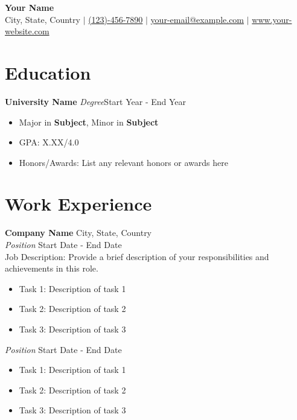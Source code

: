 \documentclass[a4paper,10pt]{article}
\newcommand{\colorLinkedinSign}{\textcolor{rgb:red,6;green,108;blue,170}{\faLinkedinSquare}}
\begin{document}
\begin{center}
\textbf{\color{myBlue}\huge Your Name} \quad \href{https://www.linkedin.com/in/your-linkedin-profile/}{\Large\colorLinkedinSign}\\
City, State, Country $\vert$ \href{tel:+1234567890}{(123)-456-7890} $\vert$ \href{mailto:your-email@example.com}{your-email@example.com} $\vert$ \href{http://www.your-website.com}{www.your-website.com}
\end{center}


\section{Education}
\textbf{University Name} \hfill \textit{Degree}\hfill Start Year - End Year
\begin{itemize}[leftmargin=*]
\setlength\itemsep{0em}
    \item Major in \textbf{Subject}, Minor in \textbf{Subject}
    \item GPA: X.XX/4.0
    \item Honors/Awards: List any relevant honors or awards here
\end{itemize}

\section{Work Experience}
\textbf{\color{myBlue}Company Name} \hfill City, State, Country\\ 
\textit{Position} \hfill Start Date - End Date\\
Job Description: Provide a brief description of your responsibilities and achievements in this role.
\begin{itemize}[leftmargin=*]
\setlength\itemsep{0em}
    \item Task 1: Description of task 1
    \item Task 2: Description of task 2
    \item Task 3: Description of task 3
\end{itemize}
\smallskip
\textit{Position} \hfill Start Date - End Date
\begin{itemize}[leftmargin=*]
\setlength\itemsep{0em}
    \item Task 1: Description of task 1
    \item Task 2: Description of task 2
    \item Task 3: Description of task 3
\end{itemize}
\end{document}
